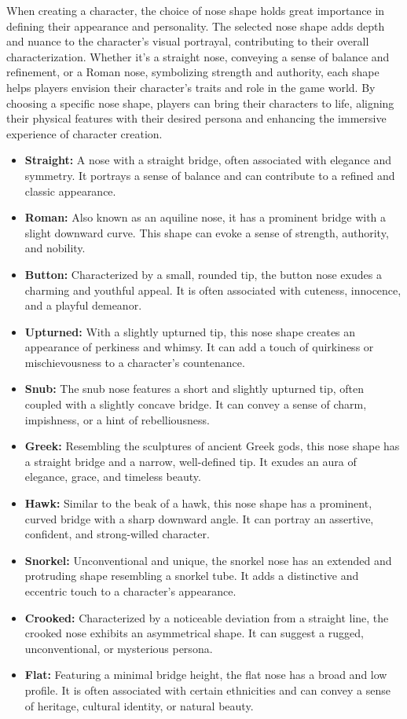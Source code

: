 \documentclass[12pt]{book}  %
\begin{document}
When creating a character, the choice of nose shape holds great importance in defining their appearance and personality. The selected nose shape adds depth and nuance to the character's visual portrayal, contributing to their overall characterization. Whether it's a straight nose, conveying a sense of balance and refinement, or a Roman nose, symbolizing strength and authority, each shape helps players envision their character's traits and role in the game world. By choosing a specific nose shape, players can bring their characters to life, aligning their physical features with their desired persona and enhancing the immersive experience of character creation.

\begin{itemize}
    \item \textbf{Straight:} A nose with a straight bridge, often associated with elegance and symmetry. It portrays a sense of balance and can contribute to a refined and classic appearance.
    \item \textbf{Roman:} Also known as an aquiline nose, it has a prominent bridge with a slight downward curve. This shape can evoke a sense of strength, authority, and nobility.
    \item \textbf{Button:} Characterized by a small, rounded tip, the button nose exudes a charming and youthful appeal. It is often associated with cuteness, innocence, and a playful demeanor.
    \item \textbf{Upturned:} With a slightly upturned tip, this nose shape creates an appearance of perkiness and whimsy. It can add a touch of quirkiness or mischievousness to a character's countenance.
    \item \textbf{Snub:} The snub nose features a short and slightly upturned tip, often coupled with a slightly concave bridge. It can convey a sense of charm, impishness, or a hint of rebelliousness.
    \item \textbf{Greek:} Resembling the sculptures of ancient Greek gods, this nose shape has a straight bridge and a narrow, well-defined tip. It exudes an aura of elegance, grace, and timeless beauty.
    \item \textbf{Hawk:} Similar to the beak of a hawk, this nose shape has a prominent, curved bridge with a sharp downward angle. It can portray an assertive, confident, and strong-willed character.
    \item \textbf{Snorkel:} Unconventional and unique, the snorkel nose has an extended and protruding shape resembling a snorkel tube. It adds a distinctive and eccentric touch to a character's appearance.
    \item \textbf{Crooked:} Characterized by a noticeable deviation from a straight line, the crooked nose exhibits an asymmetrical shape. It can suggest a rugged, unconventional, or mysterious persona.
    \item \textbf{Flat:} Featuring a minimal bridge height, the flat nose has a broad and low profile. It is often associated with certain ethnicities and can convey a sense of heritage, cultural identity, or natural beauty.
\end{itemize}
\end{document}
